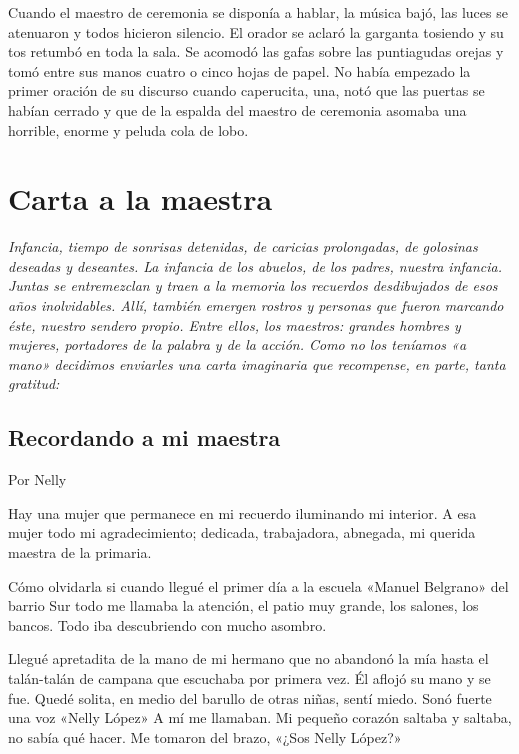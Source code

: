 \documentclass[11pt,twoside,openright,a5paper]{book}
\begin{document}
Cuando el maestro de ceremonia se disponía a hablar, la música bajó, las luces se atenuaron y todos hicieron silencio. El orador se aclaró la garganta tosiendo y su tos retumbó en toda la sala. Se acomodó las gafas sobre las puntiagudas orejas y tomó entre sus manos cuatro o cinco hojas de papel. No había empezado la primer oración de su discurso cuando caperucita, una, notó que las puertas se habían cerrado y que de la espalda del maestro de ceremonia asomaba una horrible, enorme y peluda cola de lobo.


\chapter*{Carta a la maestra}

\vspace{0.5cm}
\emph{Infancia, tiempo de sonrisas detenidas, de caricias prolongadas, de golosinas deseadas y deseantes. La infancia de los abuelos, de los padres, nuestra infancia. Juntas se entremezclan y traen a la memoria los recuerdos desdibujados de esos años inolvidables. Allí, también emergen rostros y personas que fueron marcando éste, nuestro sendero propio. Entre ellos, los maestros: grandes hombres y mujeres, portadores de la palabra y de la acción. Como no los teníamos «a mano» decidimos enviarles una carta imaginaria que recompense, en parte, tanta gratitud:}

\section*{Recordando a mi maestra}
                                                                                \begin{flushright}Por Nelly\end{flushright}

Hay una mujer que permanece en mi recuerdo iluminando mi interior. A esa mujer todo mi agradecimiento; dedicada, trabajadora, abnegada, mi querida maestra de la primaria.

Cómo olvidarla si cuando llegué  el primer día a la escuela «Manuel Belgrano» del barrio Sur todo me llamaba la atención, el patio muy grande, los salones, los bancos. Todo iba descubriendo con mucho asombro.

Llegué apretadita de la mano de mi hermano que no abandonó la mía hasta el talán-talán de campana que escuchaba por primera vez. Él  aflojó su mano y se fue. Quedé solita, en medio del barullo de otras niñas, sentí miedo. Sonó fuerte una voz «Nelly López» A mí me llamaban.  Mi pequeño corazón saltaba y saltaba, no sabía qué hacer. Me tomaron del brazo, «¿Sos Nelly López?»
\end{document}
